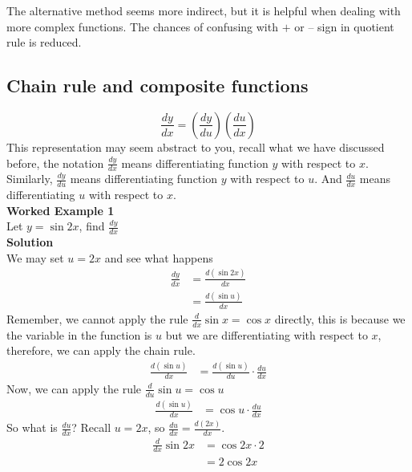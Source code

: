 \documentclass{article}
\begin{document}
The alternative method seems more indirect,
 but it is helpful when dealing with more
 complex functions. The chances of
 confusing with $+$ or $–$ sign in quotient rule
 is reduced.
\subsection{Chain rule and composite functions}
\begin{equation*}
    \frac{dy}{dx} =\left(\frac{dy}{du}\right)\left(\frac{du}{dx}\right)
\end{equation*}
This representation may seem abstract to
you, recall what we have discussed before,
the notation $\displaystyle  \frac{dy}{dx}$ means
differentiating function $y$ with respect to $x$.
Similarly, $\displaystyle  \frac{dy}{du}$ means
differentiating function $y$ with respect
to $u$. And $\displaystyle  \frac{du}{dx}$ means
differentiating $u$ with respect to $x$.\\
\textbf{Worked Example 1}\\
Let $\displaystyle  y=\sin{2x}$, find $\displaystyle  \frac{dy}{dx}$\\
\textbf{Solution}\\
We may set $u=2x$ and see what happens
\begin{equation*}
\begin{aligned}
    \frac{dy}{dx} & =\frac{d(\sin 2x)}{dx}\\
    & =\frac{d(\sin u)}{dx}
\end{aligned}
\end{equation*}
Remember, we cannot apply the rule
$\displaystyle \frac{d}{dx}\sin{x}=\cos{x}$
directly, this is because we the variable
in the function is $u$ but we are
differentiating with respect to $x$,
therefore, we can apply the chain rule.
\begin{equation*}
\begin{aligned}
    \frac{d(\sin u)}{dx} & =\frac{d(\sin u)}{du} \cdot \frac{du}{dx}
\end{aligned}
\end{equation*}
Now, we can apply the rule $\frac{d}{du}\sin{u}=\cos{u}$
\begin{equation*}
\begin{aligned}
    \frac{d(\sin u)}{dx} & =\cos u\cdot \frac{du}{dx}
\end{aligned}
\end{equation*}
So what is $\displaystyle \frac{du}{dx}$? Recall
$u=2x$, so $\displaystyle \frac{du}{dx}=\frac{d(2x)}{dx}$.
\begin{equation*}
\begin{aligned}
    \frac{d}{dx}\sin 2x & =\cos 2x\cdot 2\\
    & =2\cos 2x
\end{aligned}
\end{equation*}
\end{document}
